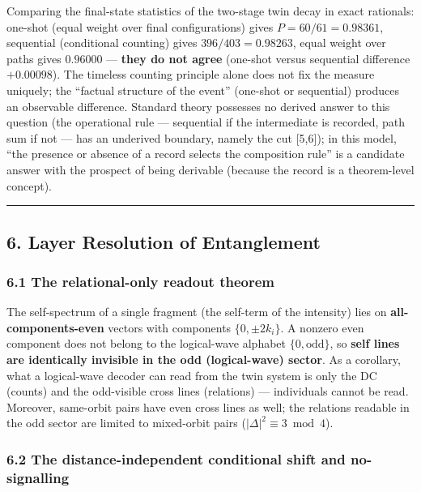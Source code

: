 \documentclass[
]{ltjsarticle}
\begin{document}
Comparing the final-state statistics of the two-stage twin decay in
exact rationals: one-shot (equal weight over final configurations) gives
\(P=60/61=0.98361\), sequential (conditional counting) gives
\(396/403=0.98263\), equal weight over paths gives \(0.96000\) ---
\textbf{they do not agree} (one-shot versus sequential difference
\(+0.00098\)). The timeless counting principle alone does not fix the
measure uniquely; the ``factual structure of the event'' (one-shot or
sequential) produces an observable difference. Standard theory possesses
no derived answer to this question (the operational rule --- sequential
if the intermediate is recorded, path sum if not --- has an underived
boundary, namely the cut {[}5,6{]}); in this model, ``the presence or
absence of a record selects the composition rule'' is a candidate answer
with the prospect of being derivable (because the record is a
theorem-level concept).

\begin{center}\rule{0.5\linewidth}{0.5pt}\end{center}

\subsection{6. Layer Resolution of
Entanglement}\label{layer-resolution-of-entanglement}

\subsubsection{6.1 The relational-only readout
theorem}\label{the-relational-only-readout-theorem}

The self-spectrum of a single fragment (the self-term of the intensity)
lies on \textbf{all-components-even} vectors with components
\(\{0,\pm2k_i\}\). A nonzero even component does not belong to the
logical-wave alphabet \(\{0,\mathrm{odd}\}\), so \textbf{self lines are
identically invisible in the odd (logical-wave) sector}. As a corollary,
what a logical-wave decoder can read from the twin system is only the DC
(counts) and the odd-visible cross lines (relations) --- individuals
cannot be read. Moreover, same-orbit pairs have even cross lines as
well; the relations readable in the odd sector are limited to
mixed-orbit pairs (\(|\Delta|^2\equiv3\bmod4\)).

\subsubsection{6.2 The distance-independent conditional shift and
no-signalling}\label{the-distance-independent-conditional-shift-and-no-signalling}
\end{document}
